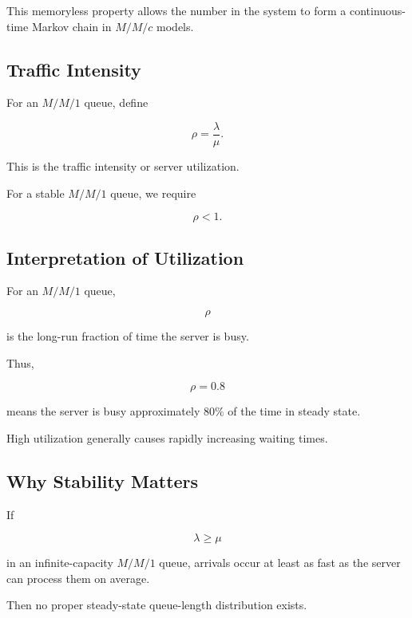 This memoryless property allows the number in the system to form a
continuous-time Markov chain in \(M/M/c\) models.

\subsection{Traffic Intensity}
\label{subsec:traffic-intensity}

For an \(M/M/1\) queue, define

\[
\boxed{
\rho
=
\frac{\lambda}{\mu}.
}
\]

This is the traffic intensity or server utilization.

For a stable \(M/M/1\) queue, we require

\[
\boxed{
\rho<1.
}
\]

\subsection{Interpretation of Utilization}
\label{subsec:queue-utilization}

For an \(M/M/1\) queue,

\[
\rho
\]

is the long-run fraction of time the server is busy.

Thus,

\[
\boxed{
\rho=0.8
}
\]

means the server is busy approximately \(80\%\) of the time in steady
state.

High utilization generally causes rapidly increasing waiting times.

\subsection{Why Stability Matters}
\label{subsec:queue-stability}

If

\[
\lambda\geq\mu
\]

in an infinite-capacity \(M/M/1\) queue, arrivals occur at least as fast as
the server can process them on average.

Then no proper steady-state queue-length distribution exists.

